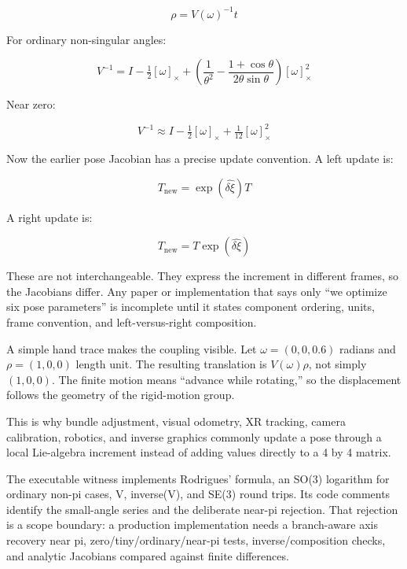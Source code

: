 \[
\rho=V(\omega)^{-1}t
\]

For ordinary non-singular angles:

\[
V^{-1}=I-\tfrac12[\omega]_\times+
\left(\frac1{\theta^2}-\frac{1+\cos\theta}{2\theta\sin\theta}\right)
[\omega]_\times^2
\]

Near zero:

\[
V^{-1}\approx I-\tfrac12[\omega]_\times+\tfrac1{12}[\omega]_\times^2
\]

Now the earlier pose Jacobian has a precise update convention. A left update is:

\[T_{\text{new}}=\exp(\widehat{\delta\xi})T\]

A right update is:

\[T_{\text{new}}=T\exp(\widehat{\delta\xi})\]

These are not interchangeable. They express the increment in different frames, so the Jacobians differ. Any paper or implementation that says only ``we optimize six pose parameters'' is incomplete until it states component ordering, units, frame convention, and left-versus-right composition.

A simple hand trace makes the coupling visible. Let \(\omega=(0,0,0.6)\) radians and \(\rho=(1,0,0)\) length unit. The resulting translation is \(V(\omega)\rho\), not simply \((1,0,0)\). The finite motion means ``advance while rotating,'' so the displacement follows the geometry of the rigid-motion group.

This is why bundle adjustment, visual odometry, XR tracking, camera calibration, robotics, and inverse graphics commonly update a pose through a local Lie-algebra increment instead of adding values directly to a 4 by 4 matrix.

The executable witness implements Rodrigues' formula, an SO(3) logarithm for ordinary non-pi cases, V, inverse(V), and SE(3) round trips. Its code comments identify the small-angle series and the deliberate near-pi rejection. That rejection is a scope boundary: a production implementation needs a branch-aware axis recovery near pi, zero/tiny/ordinary/near-pi tests, inverse/composition checks, and analytic Jacobians compared against finite differences.

